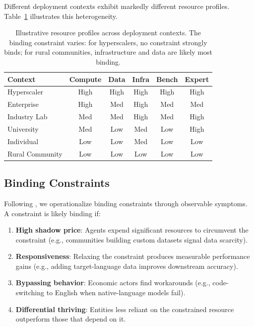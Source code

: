 Different deployment contexts exhibit markedly different resource profiles. Table~\ref{tab:contexts} illustrates this heterogeneity.

\begin{table}[t]
    \centering
    \small
    \begin{tabular}{lccccc}
        \toprule
        \textbf{Context} & \textbf{Compute} & \textbf{Data} & \textbf{Infra} & \textbf{Bench} & \textbf{Expert} \\
        \midrule
        Hyperscaler      & High             & High          & High           & High           & High            \\
        Enterprise       & High             & Med           & High           & Med            & Med             \\
        Industry Lab     & Med              & Med           & High           & Med            & High            \\
        University       & Med              & Low           & Med            & Low            & High            \\
        Individual       & Low              & Low           & Med            & Low            & Low             \\
        Rural Community  & Low              & Low           & Low            & Low            & Low             \\
        \bottomrule
    \end{tabular}
    \caption{Illustrative resource profiles across deployment contexts. The binding constraint varies: for hyperscalers, no constraint strongly binds; for rural communities, infrastructure and data are likely most binding.}
    \label{tab:contexts}
\end{table}

\subsection{Binding Constraints}

Following \citet{hausmann2005growth}, we operationalize binding constraints through observable symptoms. A constraint is likely binding if:

\begin{enumerate}
    \item \textbf{High shadow price}: Agents expend significant resources to circumvent the constraint (e.g., communities building custom datasets signal data scarcity).
    \item \textbf{Responsiveness}: Relaxing the constraint produces measurable performance gains (e.g., adding target-language data improves downstream accuracy).
    \item \textbf{Bypassing behavior}: Economic actors find workarounds (e.g., code-switching to English when native-language models fail).
    \item \textbf{Differential thriving}: Entities less reliant on the constrained resource outperform those that depend on it.
\end{enumerate}

